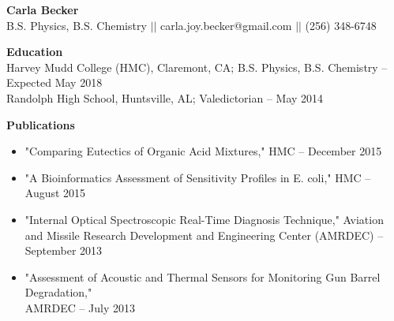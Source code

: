 \documentclass[9pt]{article}
\begin{document}
{\centering \Large \color{red} \bf Carla Becker \\}
{\centering B.S. Physics, B.S. Chemistry $\vert \vert$ carla.joy.becker@gmail.com $\vert \vert$ (256) 348-6748 \\}

\noindent
{\bf Education \\}
Harvey Mudd College (HMC), Claremont, CA; B.S. Physics, B.S. Chemistry \--- Expected May 2018 \\
Randolph High School, Huntsville, AL; Valedictorian \--- May 2014 
\vspace{3mm}

\linespread{1}

\noindent
{\bf Publications \\}
\vspace{-8mm}
\begin{itemize}[leftmargin=3.75mm]
	\setlength{\itemsep}{0pt}
    \setlength{\parskip}{0pt}
    \setlength{\parsep}{0pt}
\item "Comparing Eutectics of Organic Acid Mixtures," HMC \--- December 2015
\item "A Bioinformatics Assessment of Sensitivity Profiles in E. coli," HMC \--- August 2015
\item "Internal Optical Spectroscopic Real-Time Diagnosis Technique,"  Aviation and Missile Research Development and Engineering Center (AMRDEC) \--- September 2013
\item "Assessment of Acoustic and Thermal Sensors for Monitoring Gun Barrel Degradation," \\ AMRDEC \--- July 2013
\end{itemize}
\end{document}
